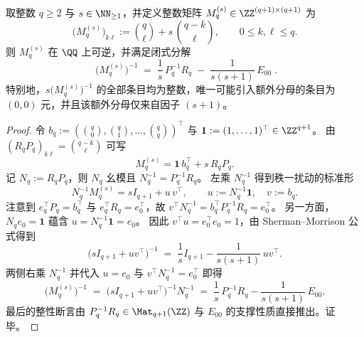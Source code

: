 \begin{conclusion}[加权互补核的闭式逆与分母支撑]\label{con:xi-exceptional-integer-model-weighted-complementary-kernel-inverse-denominator-support}
取整数 \(q\ge 2\) 与 \(s\in\NN_{\ge 1}\)，并定义整数矩阵 \(M_q^{(s)}\in\ZZ^{(q+1)\times(q+1)}\) 为
\[
\boxed{\;
\bigl(M_q^{(s)}\bigr)_{k\ell}:=\binom{q}{\ell}+s\,\binom{q-k}{\ell},
\qquad 0\le k,\ell\le q.\;}
\]
则 \(M_q^{(s)}\) 在 \(\QQ\) 上可逆，并满足闭式分解
\[
\boxed{\;
\bigl(M_q^{(s)}\bigr)^{-1}
\;=\;\frac1s\,P_q^{-1}R_q\;-\;\frac{1}{s(s+1)}\,E_{00}\; }.
\]
特别地，\(s\bigl(M_q^{(s)}\bigr)^{-1}\) 的全部条目均为整数，唯一可能引入额外分母的条目为 \((0,0)\) 元，并且该额外分母仅来自因子 \((s+1)\)。
\end{conclusion}
\begin{proof}
令 \(b_q:=(\binom{q}{0},\binom{q}{1},\dots,\binom{q}{q})^{\top}\) 与 \(\mathbf 1:=(1,\dots,1)^{\top}\in\ZZ^{q+1}\)。
由 \((R_qP_q)_{k\ell}=\binom{q-k}{\ell}\) 可写
\[
M_q^{(s)}=\mathbf 1\,b_q^{\top}+s\,R_qP_q.
\]
记 \(N_q:=R_qP_q\)，则 \(N_q\) 幺模且 \(N_q^{-1}=P_q^{-1}R_q\)。
左乘 \(N_q^{-1}\) 得到秩一扰动的标准形
\[
N_q^{-1}M_q^{(s)}=sI_{q+1}+u\,v^{\top},
\qquad
u:=N_q^{-1}\mathbf 1,\quad v:=b_q.
\]
注意到 \(e_q^{\top}P_q=b_q^{\top}\) 与 \(e_q^{\top}R_q=e_0^{\top}\)，故
\(
v^{\top}N_q^{-1}=b_q^{\top}P_q^{-1}R_q=e_0^{\top}
\)。
另一方面，\(N_qe_0=\mathbf 1\) 蕴含 \(u=N_q^{-1}\mathbf 1=e_0\)。
因此 \(v^{\top}u=e_0^{\top}e_0=1\)，由 Sherman--Morrison 公式得到
\[
\bigl(sI_{q+1}+uv^{\top}\bigr)^{-1}
\;=\;\frac1s I_{q+1}-\frac{1}{s(s+1)}\,u v^{\top}.
\]
两侧右乘 \(N_q^{-1}\) 并代入 \(u=e_0\) 与 \(v^{\top}N_q^{-1}=e_0^{\top}\) 即得
\[
\bigl(M_q^{(s)}\bigr)^{-1}
\;=\;\bigl(sI_{q+1}+uv^{\top}\bigr)^{-1}N_q^{-1}
\;=\;\frac1s\,P_q^{-1}R_q-\frac{1}{s(s+1)}\,E_{00}.
\]
最后的整性断言由 \(P_q^{-1}R_q\in\Mat_{q+1}(\ZZ)\) 与 \(E_{00}\) 的支撑性质直接推出。证毕。
\end{proof}

